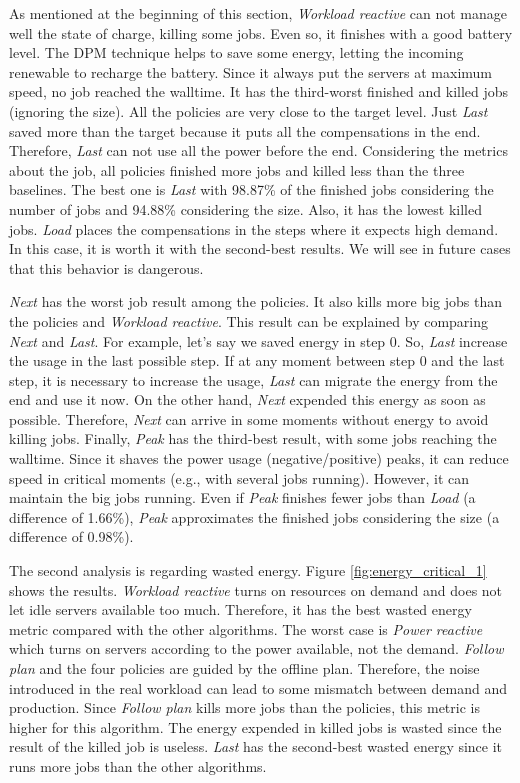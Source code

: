As mentioned at the beginning of this section, \emph{Workload reactive} can not manage well the state of charge, killing some jobs. Even so, it finishes with a good battery level. The DPM technique helps to save some energy, letting the incoming renewable to recharge the battery. Since it always put the servers at maximum speed, no job reached the walltime. It has the third-worst finished and killed jobs (ignoring the size). All the policies are very close to the target level. Just \emph{Last} saved more than the target because it puts all the compensations in the end. Therefore, \emph{Last} can not use all the power before the end. Considering the metrics about the job, all policies finished more jobs and killed less than the three baselines. The best one is \emph{Last} with 98.87\% of the finished jobs considering the number of jobs and 94.88\% considering the size. Also, it has the lowest killed jobs. \emph{Load} places the compensations in the steps where it expects high demand. In this case, it is worth it with the second-best results. We will see in future cases that this behavior is dangerous. 

\emph{Next} has the worst job result among the policies. It also kills more big jobs than the policies and \emph{Workload reactive}. This result can be explained by comparing \emph{Next} and \emph{Last}. For example, let's say we saved energy in step 0. So, \emph{Last} increase the usage in the last possible step. If at any moment between step 0 and the last step, it is necessary to increase the usage, \emph{Last} can migrate the energy from the end and use it now. On the other hand, \emph{Next} expended this energy as soon as possible. Therefore, \emph{Next} can arrive in some moments without energy to avoid killing jobs. Finally, \emph{Peak} has the third-best result, with some jobs reaching the walltime. Since it shaves the power usage (negative/positive) peaks, it can reduce speed in critical moments (e.g., with several jobs running). However, it can maintain the big jobs running. Even if \emph{Peak} finishes fewer jobs than \emph{Load} (a difference of 1.66\%), \emph{Peak} approximates the finished jobs considering the size (a difference of 0.98\%).

The second analysis is regarding wasted energy. Figure \ref{fig:energy_critical_1} shows the results. \emph{Workload reactive} turns on resources on demand and does not let idle servers available too much. Therefore, it has the best wasted energy metric compared with the other algorithms. The worst case is \emph{Power reactive} which turns on servers according to the power available, not the demand. \emph{Follow plan} and the four policies are guided by the offline plan. Therefore, the noise introduced in the real workload can lead to some mismatch between demand and production. Since \emph{Follow plan} kills more jobs than the policies, this metric is higher for this algorithm. The energy expended in killed jobs is wasted since the result of the killed job is useless. \emph{Last} has the second-best wasted energy since it runs more jobs than the other algorithms.

